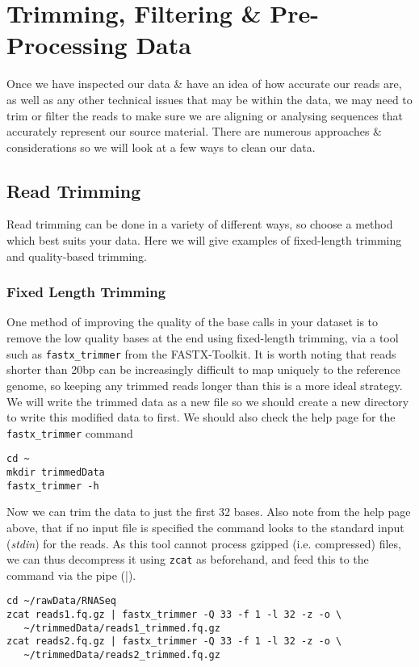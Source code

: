 \chapter{Trimming, Filtering \& Pre-Processing Data}


Once we have inspected our data \& have an idea of how accurate our reads are, as well as any other technical issues that may be within the data, we may need to trim or filter the reads to make sure we are aligning or analysing sequences that accurately represent our source material.
There are numerous approaches \& considerations so we will look at a few ways to clean our data.

\section{Read Trimming}
Read trimming can be done in a variety of different ways, so choose a method which best suits your data. 
Here we will give examples of fixed-length trimming and quality-based trimming.

\subsection{Fixed Length Trimming}
One method of improving the quality of the base calls in your dataset is to remove the low quality bases at the end using fixed-length trimming, via a tool such as \texttt{fastx_trimmer} from the FASTX-Toolkit.
It is worth noting that reads shorter than 20bp can be increasingly difficult to map uniquely to the reference genome, so keeping any trimmed reads longer than this is a more ideal strategy.
We will write the trimmed data as a new file so we should create a new directory to write this modified data to first.
We should also check the help page for the \texttt{fastx_trimmer} command
\begin{steps}
\begin{lstlisting}
cd ~
mkdir trimmedData
fastx_trimmer -h
\end{lstlisting}
\end{steps}

\begin{steps}
Now we can trim the data to just the first 32 bases.
Also note from the help page above, that if no input file is specified the command looks to the standard input (\textit{stdin}) for the reads.
As this tool cannot process gzipped (i.e. compressed) files, we can thus decompress it using \texttt{zcat} as beforehand, and feed this to the command via the pipe (|).
\begin{lstlisting}
cd ~/rawData/RNASeq
zcat reads1.fq.gz | fastx_trimmer -Q 33 -f 1 -l 32 -z -o \
   ~/trimmedData/reads1_trimmed.fq.gz
zcat reads2.fq.gz | fastx_trimmer -Q 33 -f 1 -l 32 -z -o \
   ~/trimmedData/reads2_trimmed.fq.gz
\end{lstlisting}
\end{steps}

